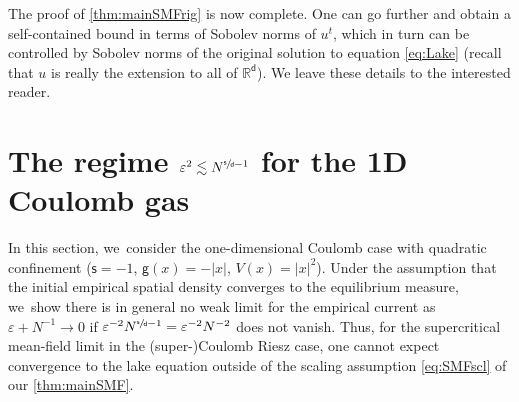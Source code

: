 \documentclass[JEP,XML,SOM,Unicode,published]{cedram}
\theoremstyle{plain}
\theoremstyle{definition}
\newcommand{\R}{{\mathbb{R}}}
\let\vep\varepsilon
\renewcommand{\d}{\mathsf{d}}
\newcommand{\g}{{\mathsf{g}}}
\newcommand{\s}{\mathsf{s}}
\begin{document}
The proof of \cref{thm:mainSMFrig} is now complete. One can go further and obtain a self-contained bound in terms of Sobolev norms of $u^t$, which in turn can be controlled by Sobolev norms of the original solution to equation \eqref{eq:Lake} (recall that $u$ is really the extension to all of $\R^\d$). We leave these details to the interested reader.

\section{The regime \texorpdfstring{$\vep^2 \lesssim N^{\sfrac{\s}{\d}-1}$ for the 1D Coulomb gas}{1DCG}}\label{sec:1DCou}

In this section, we~consider the one-dimensional Coulomb case with quadratic confinement (\ie $\s=-1$, $\g(x)= - |x|$, $V(x)=|x|^2$). Under the assumption that the initial empirical spatial density converges to the equilibrium measure, we~show there is in general no weak limit for the empirical current as $\vep + N^{-1}\to 0$ if $\vep^{-2} N^{\sfrac{\s}{\d}-1} = \vep^{-2} N^{-2}$ does not vanish. Thus, for the supercritical mean-field limit in the (super-)Coulomb Riesz case, one cannot expect convergence to the lake equation outside of the scaling assumption \eqref{eq:SMFscl} of our \cref{thm:mainSMF}.
\end{document}
